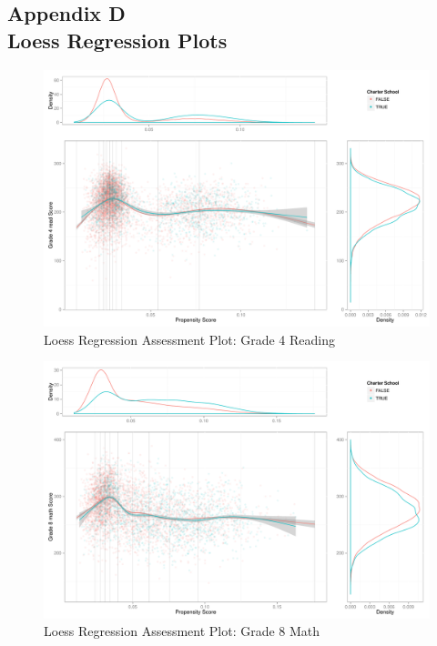 \documentclass[letterpaper,12p,twoside]{article} %
\begin{document}
\clearpage
{}
\subsection*{Appendix D\\Loess Regression Plots}

\begin{figure}[h!]
\begin{center}
\includegraphics[height=.4\textheight]{../Figures2009/g4read-loess.pdf}
\caption{Loess Regression Assessment Plot: Grade 4 Reading}
\label{fig:g4read:loess}
\end{center}
\end{figure}

\begin{figure}[h!]
\begin{center}
\includegraphics[height=.4\textheight]{../Figures2009/g8math-loess.pdf}
\caption{Loess Regression Assessment Plot: Grade 8 Math}
\label{fig:g8math:loess}
\end{center}
\end{figure}
\end{document}
